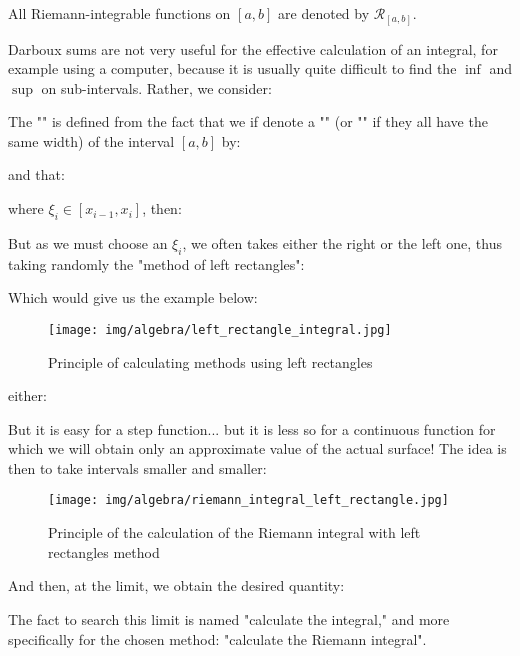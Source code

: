 	All Riemann-integrable functions on $[a, b]$ are denoted by $\mathcal{R}_{[a,b]}$.
	
	Darboux sums are not very useful for the effective calculation of an integral, for example using a computer, because it is usually quite difficult to find the $\inf$ and $\sup$ on sub-intervals. Rather, we consider:
	
	The "" is defined from the fact that we if denote a "" (or "" if they all have the same width) of the interval $[a,b]$ by:
	
	and that:
	
	where $\xi_i \in [x_{i-1},x_i]$, then:
	
	But as we must choose an $\xi_i$, we often takes either the right or the left one, thus taking randomly the "method of left rectangles":
	
	Which would give us the example below:
	\begin{figure}[H]
		\centering
		\texttt{[image: img/algebra/left\_rectangle\_integral.jpg]}
		\caption{Principle of calculating methods using left rectangles}
	\end{figure}
	either:
	
	But it is easy for a step function... but it is less so for a continuous function for which we will obtain only an approximate value of the actual surface! The idea is then to take intervals smaller and smaller:
	\begin{figure}[H]
		\centering
		\texttt{[image: img/algebra/riemann\_integral\_left\_rectangle.jpg]}
		\caption{Principle of the calculation of the Riemann integral with left rectangles method}
	\end{figure}
	And then, at the limit, we obtain the desired quantity:
	
	The fact to search this limit is named "calculate the integral," and more specifically for the chosen method: "calculate the Riemann integral".
	
